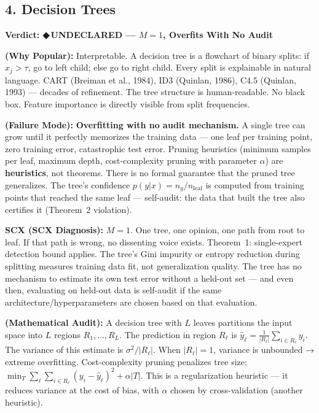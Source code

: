 \documentclass[12pt,a4paper]{article}
\theoremstyle{definition}
\newcommand{\guilty}{{\color{guiltycolor}\textbf{◆\,UNDECLARED}}}
\newcommand{\auditHeader}[1]{\medskip\noindent\textbf{\large #1}\medskip}
\newcommand{\whyPopular}{\noindent\textbf{ (Why Popular):} }
\newcommand{\whyFail}{\noindent\textbf{ (Failure Mode):} }
\newcommand{\diagnosis}{\noindent\textbf{SCX (SCX Diagnosis):} }
\newcommand{\mathAudit}{\noindent\textbf{ (Mathematical Audit):} }
\begin{document}
\subsection{4. Decision Trees }

\auditHeader{Verdict: \guilty{} — $M=1$, Overfits With No Audit}

\whyPopular{} Interpretable. A decision tree is a flowchart of binary splits: if $x_j > \tau$, go to left child; else go to right child. Every split is explainable in natural language. CART (Breiman et al., 1984), ID3 (Quinlan, 1986), C4.5 (Quinlan, 1993) — decades of refinement. The tree structure is human-readable. No black box. Feature importance is directly visible from split frequencies.

\whyFail{} \textbf{Overfitting with no audit mechanism.} A single tree can grow until it perfectly memorizes the training data — one leaf per training point, zero training error, catastrophic test error. Pruning heuristics (minimum samples per leaf, maximum depth, cost-complexity pruning with parameter $\alpha$) are \textbf{heuristics}, not theorems. There is no formal guarantee that the pruned tree generalizes. The tree's confidence $p(y|x) = n_y / n_{\text{leaf}}$ is computed from training points that reached the same leaf — self-audit: the data that built the tree also certifies it (Theorem~2 violation).

\diagnosis{} $M=1$. One tree, one opinion, one path from root to leaf. If that path is wrong, no dissenting voice exists. Theorem~1: single-expert detection bound applies. The tree's Gini impurity or entropy reduction during splitting measures training data fit, not generalization quality. The tree has no mechanism to estimate its own test error without a held-out set — and even then, evaluating on held-out data is self-audit if the same architecture/hyperparameters are chosen based on that evaluation.

\mathAudit{} A decision tree with $L$ leaves partitions the input space into $L$ regions $R_1, \ldots, R_L$. The prediction in region $R_\ell$ is $\hat{y}_\ell = \frac{1}{|R_\ell|}\sum_{i \in R_\ell} y_i$. The variance of this estimate is $\sigma^2 / |R_\ell|$. When $|R_\ell| = 1$, variance is unbounded → extreme overfitting. Cost-complexity pruning penalizes tree size: $\min_{T} \sum_{\ell} \sum_{i \in R_\ell} (y_i - \hat{y}_\ell)^2 + \alpha |T|$. This is a regularization heuristic — it reduces variance at the cost of bias, with $\alpha$ chosen by cross-validation (another heuristic).
\end{document}
